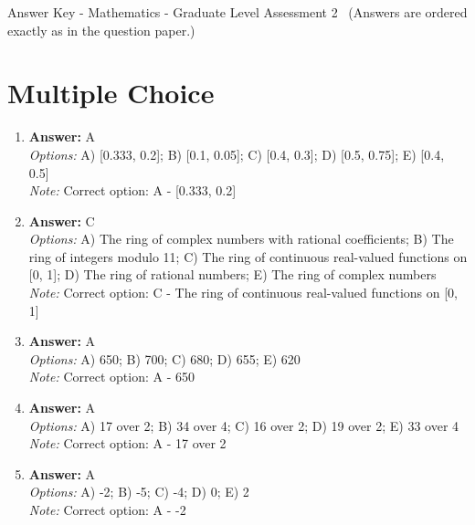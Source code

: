 \documentclass[12pt]{article}
\begin{document}
\begin{center}
Answer Key - Mathematics - Graduate Level Assessment 2 \
\small (Answers are ordered exactly as in the question paper.)
\end{center}

\section*{Multiple Choice}
\begin{enumerate}[label=\arabic*.]
\item \textbf{Answer:} A
\\ \textit{Options:} A) [0.333, 0.2]; B) [0.1, 0.05]; C) [0.4, 0.3]; D) [0.5, 0.75]; E) [0.4, 0.5]
\\ \textit{Note:} Correct option: A - [0.333, 0.2]
\item \textbf{Answer:} C
\\ \textit{Options:} A) The ring of complex numbers with rational coefficients; B) The ring of integers modulo 11; C) The ring of continuous real-valued functions on [0, 1]; D) The ring of rational numbers; E) The ring of complex numbers
\\ \textit{Note:} Correct option: C - The ring of continuous real-valued functions on [0, 1]
\item \textbf{Answer:} A
\\ \textit{Options:} A) 650; B) 700; C) 680; D) 655; E) 620
\\ \textit{Note:} Correct option: A - 650
\item \textbf{Answer:} A
\\ \textit{Options:} A) 17 over 2; B) 34 over 4; C) 16 over 2; D) 19 over 2; E) 33 over 4
\\ \textit{Note:} Correct option: A - 17 over 2
\item \textbf{Answer:} A
\\ \textit{Options:} A) -2; B) -5; C) -4; D) 0; E) 2
\\ \textit{Note:} Correct option: A - -2
\end{enumerate}
\end{document}
